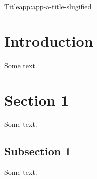 \begin{appchaptercover}{Title}{app:app-a-title-slugified}
\section{Introduction}
Some text.


\section{Section 1}
Some text.

\subsection{Subsection 1}
Some text.

\end{appchaptercover}
